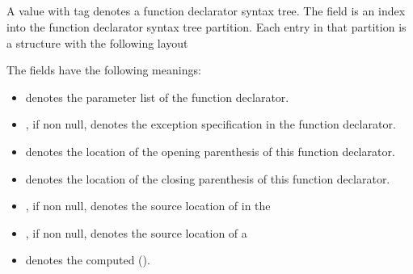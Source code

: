 
\subsection{}
\label{sec:ifc:SyntaxSort:FunctionDeclarator}


A  value with tag  denotes a function declarator syntax tree.
The  field is an index into the function declarator syntax tree partition.
Each entry in that partition is a structure with the following layout
%
\begin{figure}[H]
	\centering
	\label{fig:ifc:SyntaxSort:FunctionDeclarator}
\end{figure}
%
The fields have the following meanings:
\begin{itemize}
	\item {} denotes the parameter list of the function declarator.
	\item {}, if non null, denotes the exception specification in the function declarator.
	\item {} denotes the location of the opening parenthesis of this function declarator.
	\item {} denotes the location of the closing parenthesis of this function declarator.
	\item {}, if non null, denotes the source location of  in the 
	\item {}, if non null, denotes the source location of a 
	\item {} denotes the computed  ().
\end{itemize}


